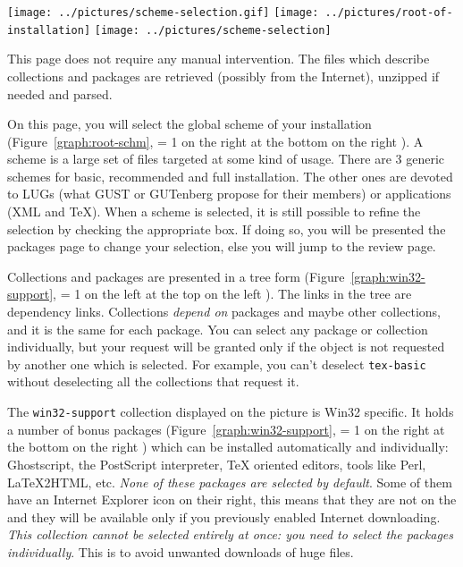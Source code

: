 \documentclass{article}
\begin{document}
\begin{description}
\begin{figure*}[!htb]
\begin{center}
\texttt{[image: ../pictures/scheme-selection.gif]}
    \else
        \texttt{[image: ../pictures/root-of-installation]}%
                        \hfill%
        \texttt{[image: ../pictures/scheme-selection]}
    \fi
  \fi
 \caption{\TeXLive-Setup: Root and directories / Schemes}\label{graph:root-schm}
 \end{center}
\end{figure*}
\item[Get TPM Page] 
  This page does not require any manual intervention. The 
  files which describe collections and packages are retrieved
  (possibly from the Internet), unzipped if needed and parsed.
\item[Schemes Page]
  On this page, you will select the global scheme of your
  installation (Figure~\ref{graph:root-schm}, 
  \ifnum \Status = 1
  on the right%
  \else\ifnum {}
  at the bottom%
  \else
  on the right%
  \fi\fi
  ). A scheme is a large set of files targeted at some kind
  of usage. There are 3 generic schemes for basic, recommended and
  full installation. The other ones are devoted to LUGs (what GUST or
  GUTenberg propose for their members) or applications (XML and
  \TeX{}).
  When a scheme is selected, it is still possible to refine the
  selection by checking the appropriate box. If doing so, you will be
  presented the packages page to change your selection, else you will
  jump to the review page.
\item[Packages Page] 
  Collections and packages are presented in a tree form
  (Figure~\ref{graph:win32-support}, 
  \ifnum \Status = 1
  on the left%
  \else\ifnum {}
  at the top%
  \else
  on the left%
  \fi\fi
  ). The links
  in the tree are dependency links. Collections \emph{depend on}
  packages and maybe other collections, and it is the same for each
  package. You can select any package or collection individually, but
  your request will be granted only if the object is not requested by
  another one which is selected. For example, you can't deselect
  \texttt{tex-basic} without deselecting all the collections that
  request it.

  The \texttt{win32-support} collection displayed on the picture is Win32 specific. It
  holds a number of bonus packages (Figure~\ref{graph:win32-support}, 
  \ifnum \Status = 1
  on the right%
  \else\ifnum {}
  at the bottom%
  \else
  on the right%
  \fi\fi
  ) which can be installed
  automatically and individually: Ghostscript, the PostScript
  interpreter, \TeX{} oriented editors, tools like Perl,
  \LaTeX{}2HTML, etc. \emph{None of these packages are selected by
    default}. Some of them have an Internet Explorer icon on their
  right, this means that they are not on the \CD{} and they will be
  available only if you previously enabled  Internet
  downloading. \emph{This collection cannot be selected entirely at
    once: you need to select the packages individually}. This is to
  avoid unwanted downloads of huge files.


\end{description}
\end{document}
